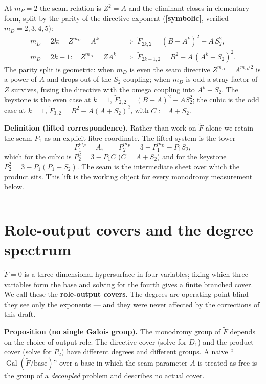 \documentclass[11pt]{article}
\theoremstyle{plain}
\theoremstyle{definition}
\theoremstyle{remark}
\begin{document}
At \(m_P=2\) the seam relation is \(Z^2 = A\) and the eliminant closes in elementary form, split by the parity of the directive exponent (\textbf{{[}symbolic{]}}, verified \(m_D = 2,3,4,5\)): \[
\begin{aligned}
m_D = 2k:\quad Z^{m_D}=A^k &\;\Rightarrow\; \widetilde F_{2k,2} = (B - A^k)^2 - A\,S_2^2,\\
m_D = 2k{+}1:\quad Z^{m_D}=Z A^k &\;\Rightarrow\; \widetilde F_{2k+1,2} = B^2 - A\,(A^k + S_2)^2.
\end{aligned}
\] The parity split is geometric: when \(m_D\) is even the seam directive \(Z^{m_D}=A^{m_D/2}\) is a power of \(A\) and drops out of the \(S_2\)-coupling; when \(m_D\) is odd a stray factor of \(Z\) survives, fusing the directive with the omega coupling into \(A^k+S_2\). The keystone is the even case at \(k=1\), \(\widetilde F_{2,2}=(B-A)^2 - A S_2^2\); the cubic is the odd case at \(k=1\), \(\widetilde F_{3,2}=B^2 - A(A+S_2)^2\), with \(C := A+S_2\).

\textbf{Definition (lifted correspondence).} Rather than work on \(\widetilde F\) alone we retain the seam \(P_1\) as an explicit fibre coordinate. The lifted system is the tower \[
P_1^{m_P} = A, \qquad P_2^{m_P} = 3 - P_1^{m_D} - P_1 S_2,
\] which for the cubic is \(P_2^2 = 3 - P_1 C\) (\(C = A+S_2\)) and for the keystone \(P_2^2 = 3 - P_1(P_1+S_2)\). The seam is the intermediate sheet over which the product sits. This lift is the working object for every monodromy measurement below.

\begin{center}\rule{0.5\linewidth}{0.5pt}\end{center}

\hypertarget{role-output-covers-and-the-degree-spectrum}{%
\section{Role-output covers and the degree spectrum}\label{role-output-covers-and-the-degree-spectrum}}

\(\widetilde F = 0\) is a three-dimensional hypersurface in four variables; fixing which three variables form the base and solving for the fourth gives a finite branched cover. We call these the \textbf{role-output covers}. The degrees are operating-point-blind --- they see only the exponents --- and they were never affected by the corrections of this draft.

\textbf{Proposition (no single Galois group).} The monodromy group of \(\widetilde F\) depends on the choice of output role. The directive cover (solve for \(D_1\)) and the product cover (solve for \(P_2\)) have different degrees and different groups. A naive ``\(\operatorname{Gal}(\widetilde F/\text{base})\)'' over a base in which the seam parameter \(A\) is treated as free is the group of a \emph{decoupled} problem and describes no actual cover.
\end{document}
